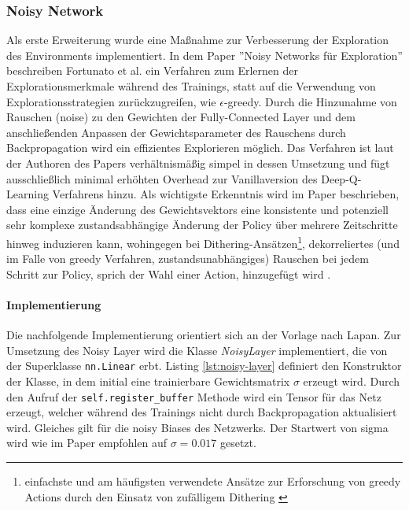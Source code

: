\documentclass[11pt]{scrartcl}
\begin{document}
\subsubsection{Noisy Network}
Als erste Erweiterung wurde eine Maßnahme zur Verbesserung der Exploration des Environments implementiert.
In dem Paper ''Noisy Networks für Exploration'' beschreiben Fortunato et al.\cite[~S.1 f.]{FAPMOGM2017}
ein Verfahren zum Erlernen der Explorationsmerkmale während des Trainings, statt auf die Verwendung von
Explorationsstrategien zurückzugreifen, wie $\epsilon$-greedy. Durch die Hinzunahme von Rauschen (noise)
zu den Gewichten der Fully-Connected Layer und dem anschließenden Anpassen der Gewichtsparameter des
Rauschens durch Backpropagation wird ein effizientes Explorieren möglich. Das Verfahren ist laut der
Authoren des Papers verhältnismäßig simpel in dessen Umsetzung und fügt ausschließlich minimal erhöhten
Overhead zur Vanillaversion des Deep-Q-Learning Verfahrens hinzu. Als wichtigste Erkenntnis wird im Paper
beschrieben, dass eine einzige Änderung des Gewichtsvektors eine konsistente und potenziell sehr komplexe
zustandsabhängige Änderung der Policy über mehrere Zeitschritte hinweg induzieren kann, wohingegen bei
Dithering-Ansätzen\footnote{einfachste und am häufigsten verwendete Ansätze zur Erforschung von greedy
Actions durch den Einsatz von zufälligem Dithering \cite[~S.2]{ORRW2019}}, dekorreliertes (und im Falle von
greedy Verfahren, zustandsunabhängiges) Rauschen bei jedem Schritt zur Policy, sprich der Wahl einer
Action, hinzugefügt wird \cite[~S.2]{FAPMOGM2017}. 

\paragraph*{Implementierung}
\noindent
\newline
Die nachfolgende Implementierung orientiert sich an der Vorlage nach Lapan\cite[~S.179]{L2018}.
Zur Umsetzung des Noisy Layer wird die Klasse \textit{NoisyLayer} implementiert, die von der
Superklasse \lstinline!nn.Linear! erbt. Listing \ref{lst:noisy-layer} definiert den Konstruktor
der Klasse, in dem initial eine trainierbare Gewichtsmatrix $\sigma$ erzeugt wird. Durch den
Aufruf der \lstinline!self.register_buffer! Methode wird ein Tensor für das Netz erzeugt, welcher
während des Trainings nicht durch Backpropagation aktualisiert wird. Gleiches gilt für die noisy
Biases des Netzwerks. Der Startwert von sigma wird wie im Paper empfohlen \cite[~S.6]{FAPMOGM2017}
auf $\sigma=0.017$ gesetzt.
\end{document}
